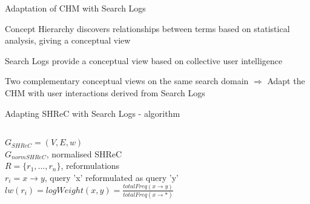 \begin{frame}{Adaptation of CHM with Search Logs}

Concept Hierarchy discovers relationships between terms based on statistical analysis, giving a conceptual view \newline

Search Logs provide a conceptual view based on collective user intelligence \newline

Two complementary conceptual views on the same search domain
$ \Rightarrow $
Adapt the CHM with user interactions derived from Search Logs

\end{frame}


\begin{frame}{Adapting SHReC with Search Logs - algorithm}

\begin{scriptsize}
	\begin{columns}
		\begin{column}[l]{0.5\textwidth}
			$ G_{SHReC} = (V, E, w) $ \\
			$ G_{normSHReC} $, normalised SHReC \\
			$ R = \{r_{1}, ..., r_{n}\} $, reformulations \\
			$ r_{i} = x \rightarrow y $, query 'x' reformulated as query 'y' \\
			$ lw(r_{i}) = logWeight(x, y) = \frac{totalFreq(x \rightarrow y)}{totalFreq(x \rightarrow *)} $ \\
		\end{column}


\end{columns}
\end{scriptsize}
\end{frame}
